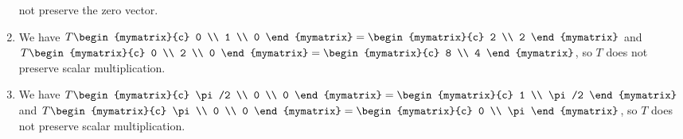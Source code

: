 \begin{ex}
\begin{sol}
\begin{enumerate}
      not preserve the zero vector.
    \item We have
      $T\begin{mymatrix}{c} 0 \\ 1 \\ 0 \end{mymatrix}
      = \begin{mymatrix}{c} 2 \\ 2 \end{mymatrix}$ and
      $T\begin{mymatrix}{c} 0 \\ 2 \\ 0 \end{mymatrix}
      = \begin{mymatrix}{c} 8 \\ 4 \end{mymatrix}$, so $T$ does not
      preserve scalar multiplication.
    \item We have 
      $T\begin{mymatrix}{c} \pi/2 \\ 0 \\ 0 \end{mymatrix}
      = \begin{mymatrix}{c} 1 \\ \pi/2 \end{mymatrix}$ and
      $T\begin{mymatrix}{c} \pi \\ 0 \\ 0 \end{mymatrix}
      = \begin{mymatrix}{c} 0 \\ \pi \end{mymatrix}$, so $T$ does not
      preserve scalar multiplication.
    \end{enumerate}
  \end{sol}
\end{ex}

